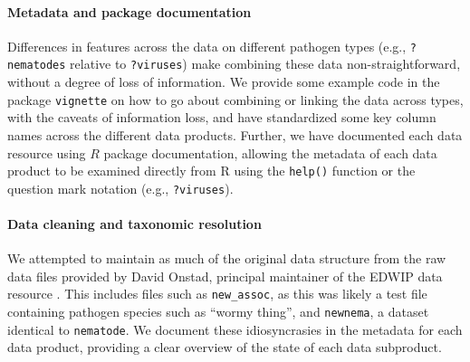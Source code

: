 \documentclass[12pt]{article}
\begin{document}
\paragraph*{Metadata and package documentation}

Differences in features across the data on different pathogen types (e.g., \texttt{?nematodes} relative to \texttt{?viruses}) make combining these data non-straightforward, without a degree of loss of information. We provide some example code in the package \texttt{vignette} on how to go about combining or linking the data across types, with the caveats of information loss, and have standardized some key column names across the different data products. Further, we have documented each data resource using $R$ package documentation, allowing the metadata of each data product to be examined directly from R using the \texttt{help()} function or the question mark notation (e.g., \texttt{?viruses}). 




\paragraph*{Data cleaning and taxonomic resolution}

We attempted to maintain as much of the original data structure from the raw data files provided by David Onstad, principal maintainer of the EDWIP data resource \citep{onstad1997}. This includes files such as \texttt{new\_assoc}, as this was likely a test file containing pathogen species such as ``wormy thing'', and \texttt{newnema}, a dataset identical to \texttt{nematode}. We document these idiosyncrasies in the metadata for each data product, providing a clear overview of the state of each data subproduct. 
\end{document}
